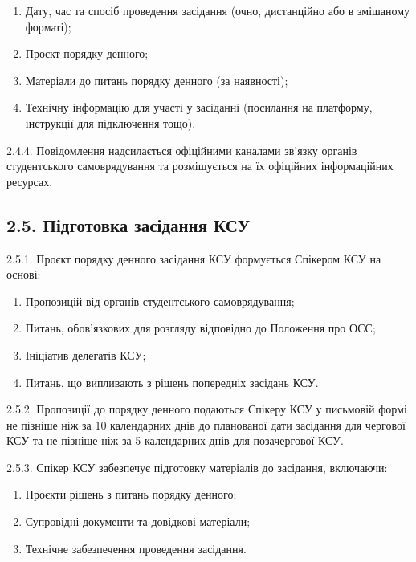         \begin{enumerate}[label=\alph*)]
            \item Дату, час та спосіб проведення засідання (очно, дистанційно або в змішаному форматі);
            \item Проєкт порядку денного;
            \item Матеріали до питань порядку денного (за наявності);
            \item Технічну інформацію для участі у засіданні (посилання на платформу, інструкції для підключення тощо).
        \end{enumerate}

    2.4.4. Повідомлення надсилається офіційними каналами зв'язку органів студентського самоврядування та розміщується на їх офіційних інформаційних ресурсах.

\subsection*{2.5. Підготовка засідання КСУ}
    2.5.1. Проєкт порядку денного засідання КСУ формується Спікером КСУ на основі:

        \begin{enumerate}[label=\alph*)]
            \item Пропозицій від органів студентського самоврядування;
            \item Питань, обов'язкових для розгляду відповідно до Положення про ОСС;
            \item Ініціатив делегатів КСУ;
            \item Питань, що випливають з рішень попередніх засідань КСУ.
        \end{enumerate}

    2.5.2. Пропозиції до порядку денного подаються Спікеру КСУ у письмовій формі не пізніше ніж за 10 календарних днів до планованої дати засідання для чергової КСУ та не пізніше ніж за 5 календарних днів для позачергової КСУ.

    2.5.3. Спікер КСУ забезпечує підготовку матеріалів до засідання, включаючи:

        \begin{enumerate}[label=\alph*)]
            \item Проєкти рішень з питань порядку денного;
            \item Супровідні документи та довідкові матеріали;
            \item Технічне забезпечення проведення засідання.
        \end{enumerate}

